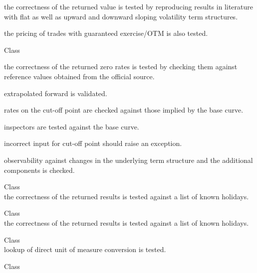 \begin{DoxyRefList}
\begin{DoxyItemize}
\item the correctness of the returned value is tested by reproducing results in literature with flat as well as upward and downward sloping volatility term structures.
\item the pricing of trades with guaranteed exercise/\+OTM is also tested. 
\end{DoxyItemize}
\item[Class \doxylink{class_quant_lib_1_1_ultimate_forward_term_structure}{Quant\+Lib\+::Ultimate\+Forward\+Term\+Structure} ]\hfill \\
\label{test__test000167}%
%

\begin{DoxyItemize}
\item the correctness of the returned zero rates is tested by checking them against reference values obtained from the official source.
\item extrapolated forward is validated.
\item rates on the cut-\/off point are checked against those implied by the base curve.
\item inspectors are tested against the base curve.
\item incorrect input for cut-\/off point should raise an exception.
\item observability against changes in the underlying term structure and the additional components is checked. 
\end{DoxyItemize}
\item[Class \doxylink{class_quant_lib_1_1_united_kingdom}{Quant\+Lib\+::United\+Kingdom} ]\hfill \\
\label{test__test000176}%
%
the correctness of the returned results is tested against a list of known holidays.  
\item[Class \doxylink{class_quant_lib_1_1_united_states}{Quant\+Lib\+::United\+States} ]\hfill \\
\label{test__test000177}%
%
the correctness of the returned results is tested against a list of known holidays.  
\item[Class \doxylink{class_quant_lib_1_1_unit_of_measure_conversion_manager}{Quant\+Lib\+::Unit\+Of\+Measure\+Conversion\+Manager} ]\hfill \\
\label{test__test000009}%
%
lookup of direct unit of measure conversion is tested.  
\item[Class \doxylink{class_quant_lib_1_1_vanilla_swap}{Quant\+Lib\+::Vanilla\+Swap} ]\hfill \\
\label{test__test000026}%
%


\end{DoxyRefList}
